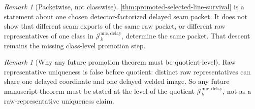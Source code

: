 \documentclass[11pt]{article}
\theoremstyle{definition}
\theoremstyle{plain}
\theoremstyle{remark}
\newtheorem{remark}[definition]{Remark}
\begin{document}
\begin{remark}[Packetwise, not classwise]
\label{rem:packetwise-not-classwise}
\cref{thm:promoted-selected-line-survival} is a statement about one chosen detector-factorized
delayed seam packet.
It does not show that different seam exports of the same raw packet, or different raw
representatives of one class in \(\mathcal J^{\mathrm{mic,delay}}_k\), determine the same packet.
That descent remains the missing class-level promotion step.
\end{remark}

\begin{remark}[Why any future promotion theorem must be quotient-level]
\label{rem:promotion-shortest-route}
Raw representative uniqueness is false before quotient: distinct raw representatives can share one
delayed coordinate and one delayed welded image.
So any future manuscript theorem must be stated at the level of the quotient
\(\mathcal J^{\mathrm{mic,delay}}_k\), not as a raw-representative uniqueness claim.
\end{remark}
\end{document}
